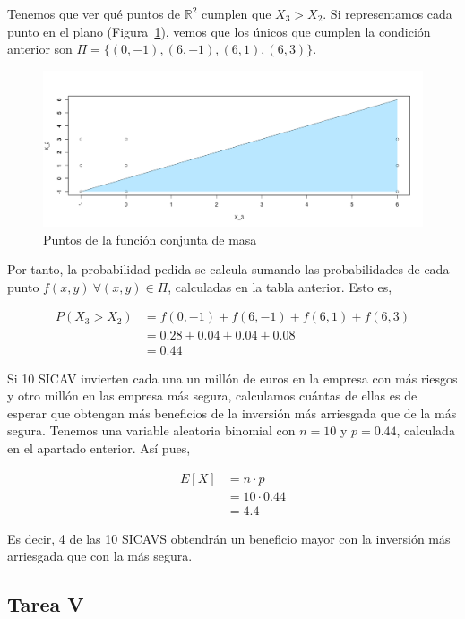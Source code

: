 \documentclass[12pt,a4paper,twoside,openright,titlepage,final]{article}
\begin{document}
Tenemos que ver qué puntos de $\mathbb{R}^2$ cumplen que $X_3 > X_2$. Si representamos cada punto en el plano (Figura~\ref{fig:puntos_discreta}), vemos que los únicos que cumplen la condición anterior son $\Pi = \{(0,-1), (6,-1), (6,1), (6,3)\}$.\\

\begin{figure}[tbph!]
\centering
\includegraphics[width=0.9\linewidth]{imagenes/puntos_discreta}
\caption{Puntos de la función conjunta de masa}
\label{fig:puntos_discreta}
\end{figure}

Por tanto, la probabilidad pedida se calcula sumando las probabilidades de cada punto $f(x,y) \ \forall (x,y) \in \Pi$, calculadas en la tabla anterior. Esto es,

\begin{align*}
P(X_3 > X_2) & = f(0,-1) + f(6, -1) + f(6,1) + f(6,3) \\
& = 0.28 + 0.04 + 0.04 + 0.08 \\
& = 0.44
\end{align*} 

Si 10 SICAV invierten cada una un millón de euros en la empresa con más riesgos y otro millón en las empresa más segura, calculamos cuántas de ellas es de esperar que obtengan más beneficios de la inversión más arriesgada que de la más segura. Tenemos una variable aleatoria binomial con $n =10$ y $p = 0.44$, calculada en el apartado enterior. Así pues,

\begin{align*}
E[X] & = n \cdot p \\
& = 10 \cdot 0.44 \\
& = 4.4 
\end{align*}

Es decir, 4 de las 10 SICAVS obtendrán un beneficio mayor con la inversión más arriesgada que con la más segura.

\subsection{Tarea V}
\end{document}
